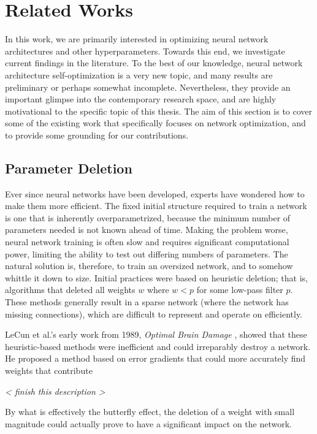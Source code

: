 \chapter{Related Works}

In this work, we are primarily interested in optimizing neural network architectures and other hyperparameters.
Towards this end, we investigate current findings in the literature.
To the best of our knowledge, neural network architecture self-optimization is a very new topic, and many results are preliminary or perhaps somewhat incomplete.
Nevertheless, they provide an important glimpse into the contemporary research space, and are highly motivational to the specific topic of this thesis.
The aim of this section is to cover some of the existing work that specifically focuses on network optimization, and to provide some grounding for our contributions.

\section{Parameter Deletion}
Ever since neural networks have been developed, experts have wondered how to make them more efficient.
The fixed initial structure required to train a network is one that is inherently overparametrized, because the minimum number of parameters needed is not known ahead of time.
Making the problem worse, neural network training is often slow and requires significant computational power, limiting the ability to test out differing numbers of parameters.
The natural solution is, therefore, to train an oversized network, and to somehow whittle it down to size.
Initial practices were based on heuristic deletion; that is, algorithms that deleted all weights $w$ where $w < p$ for some low-pass filter $p$.
These methods generally result in a sparse network (where the network has missing connections), which are difficult to represent and operate on efficiently.

LeCun et al.'s early work from 1989, \emph{Optimal Brain Damage} \cite{lecun1989optimal}, showed that these heuristic-based methods were inefficient and could irreparably destroy a network.
He proposed a method based on error gradients that could more accurately find weights that contribute 

\emph{ < finish this description > }

By what is effectively the butterfly effect, the deletion of a weight with small magnitude could actually prove to have a significant impact on the network.

